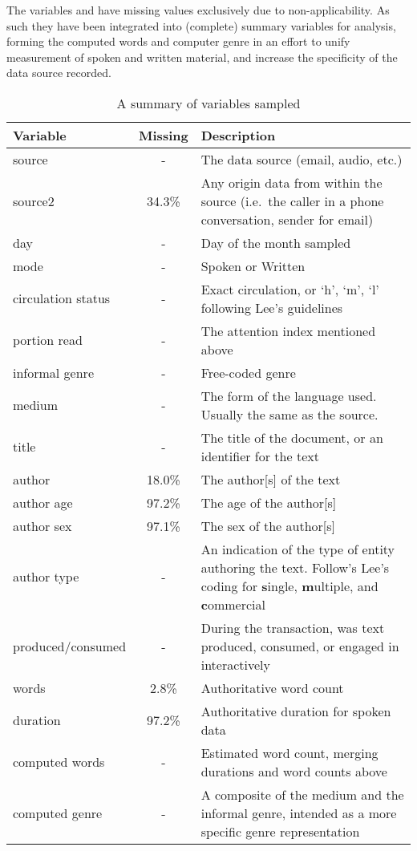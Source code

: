 The variables  and  have missing values exclusively due to non-applicability.  As such they have been integrated into (complete) summary variables for analysis, forming the computed words and computer genre in an effort to unify measurement of spoken and written material, and increase the specificity of the data source recorded.


\begin{table}[hp]
\centering
    \begin{tabular}{|l|c|p{7cm}|}
    \hline
    \textbf{Variable} & \textbf{Missing} & \textbf{Description} \\ \hline
   
    source              & - & The data source (email, audio, etc.) \\ \hline
    source2             & 34.3\% & Any origin data from within the source (i.e.\ the caller in a phone conversation, sender for email) \\ \hline
    day                 & - & Day of the month sampled \\ \hline
    mode                & - & Spoken or Written \\ \hline
    circulation status  & - & Exact circulation, or `h', `m', `l' following Lee's guidelines\\ \hline
    portion read        & - & The attention index mentioned above \\ \hline
    informal genre      & - & Free-coded genre \\ \hline
    medium              & - & The form of the language used.  Usually the same as the source. \\ \hline
    title               & - & The title of the document, or an identifier for the text \\ \hline
    author              & 18.0\% & The author[s] of the text\\ \hline
    author age          & 97.2\% & The age of the author[s] \\ \hline
    author sex          & 97.1\% & The sex of the author[s] \\ \hline
    author type         & - & An indication of the type of entity authoring the text.  Follow's Lee's coding for \textbf{s}ingle, \textbf{m}ultiple, and \textbf{c}ommercial\\ \hline
    produced/consumed   & - & During the transaction, was text produced, consumed, or engaged in interactively \\ \hline 
    words               & 2.8\% & Authoritative word count\\ \hline
    duration            & 97.2\% & Authoritative duration for spoken data\\ \hline
    computed words      & - & Estimated word count, merging durations and word counts above\\ \hline
    computed genre      & - & A composite of the medium and the informal genre, intended as a more specific genre representation \\
    \hline
    \end{tabular}
\caption{A summary of variables sampled}
\label{table:personal:variables}
\end{table}
